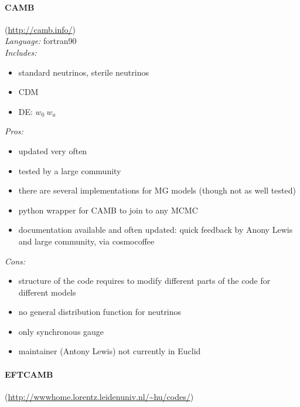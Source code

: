 \paragraph{CAMB}
(\url{http://camb.info/})\\
{\it Language:} fortran90\\
{\it Includes:}\\
\begin{itemize}
 \item standard neutrinos, sterile neutrinos
 \item CDM
 \item DE: $w_0\ w_a$
\end{itemize}
{\it Pros: }
\begin{itemize}
 \item updated very often
 \item tested by a large community
 \item there are several implementations for MG models (though not as well tested)
 \item python wrapper for CAMB to join to any MCMC
 \item documentation available and often updated: quick feedback by Anony Lewis and large community, via cosmocoffee
\end{itemize}
{\it Cons:}
\begin{itemize}
 \item structure of the code requires to modify different parts of the code for different models
 \item no general distribution function for neutrinos
 \item only synchronous gauge
 \item maintainer (Antony Lewis) not currently in Euclid
\end{itemize}


\paragraph{EFTCAMB}(\url{http://wwwhome.lorentz.leidenuniv.nl/~hu/codes/})\\

